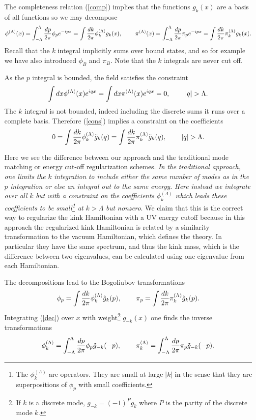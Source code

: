 \def\letter{0}\def\pr{0}\documentclass[a4paper,12pt, epsfig]{article}
\def\hsp{,\hspace{.7cm}}
\renewcommand{\(}{\begin{equation}}
\renewcommand{\)}{end{equation} \vspace{-.05in}\linebreak}
\renewcommand{\=}{\hspace{-.03in}=\hspace{-.02in}}
\renewcommand{\(}{\begin{equation}}
\renewcommand{\)}{\end{equation}}
\renewcommand{\hsp}{,\hspace{.3in}}
\renewcommand{\(}{\begin{equation}}
\renewcommand{\)}{\end{equation}}
\def\lpin#1{\int^\Lambda_{-\Lambda} \frac{d#1}{2\pi}}
\def\pin#1{\int \frac{d#1}{2\pi}}
\renewcommand{\L}{{(\Lambda)}}
\newcommand{\beq}{\begin{equation}}
\newcommand{\eeq}{\end{equation}}
\begin{document}
The completeness relation (\ref{comp}) implies that the functions $g_k(x)$ are a basis of all functions so we may decompose
\beq
\phi^\L(x)=\lpin{p} \phi_p e^{-ipx}=\pin{k}\phi^\L_k g_k(x)
\hsp
\pi^\L(x)=\lpin{p} \pi_p e^{-ipx}=\pin{k}\pi^\L_k g_k(x). \label{dec}
\eeq
Recall that the $k$ integral implicitly sums over bound states, and so for example we have also introduced $\phi_B$ and $\pi_B$.  %
Note that the $k$ integrals are never cut off.

As the $p$ integral is bounded, the field satisfies the constraint
\beq
\int dx \phi^\L(x) e^{iqx}=\int dx \pi^\L(x) e^{iqx}=0\hsp |q|>\Lambda. \label{cons}
\eeq
The $k$ integral is not bounded, indeed including the discrete sums it runs over a complete basis.  Therefore (\ref{cons}) implies a constraint on the coefficients
\beq
0= \pin{k}\phi^\L_k \tilde{g}_k(q)= \pin{k}\pi^\L_k \tilde{g}_k(q)\hsp |q|>\Lambda.  \label{ccons}
\eeq

Here we see the difference between our approach and the traditional mode matching \cite{dhn2} or energy cut-off \cite{rebhan} regularization schemes.  {\it{In the traditional approach, one limits the $k$ integration to include either the same number of modes as in the $p$ integration or else an integral out to the same energy.  Here instead we integrate over all $k$ but with a constraint on the coefficients $\phi^\L_k$ which leads these coefficients to be small\footnote{The $\phi^\L_k$ are operators.  They are small at large $|k|$ in the sense that they are superpositions of $\phi_p$ with small coefficients.} at $k>\Lambda$ but nonzero}}.  We claim that this is the correct way to regularize the kink Hamiltonian with a UV energy cutoff because in this approach the regularized kink Hamiltonian is related by a similarity transformation to the vacuum Hamiltonian, which defines the theory. In particular they have the same spectrum, and thus the kink mass, which is the difference between two eigenvalues, can be calculated using one eigenvalue from each Hamiltonian.

The decompositions lead to the Bogoliubov transformations
\beq
\phi_p= \pin{k}\phi^\L_k \tilde{g}_k(p)\hsp
\pi_p=\pin{k}\pi^\L_k \tilde{g}_k(p).
\eeq
Integrating (\ref{dec}) over $x$ with weight\footnote{If $k$ is a discrete mode, $g_{-k}=(-1)^Pg_k$ where $P$ is the parity of the discrete mode $k$.} $g_{-k}(x)$ one finds the inverse transformations
\beq
\phi^\L_k=\lpin{p}\phi_p\tilde{g}_{-k}(-p)\hsp
\pi^\L_k=\lpin{p}\pi_p\tilde{g}_{-k}(-p). %
\eeq
\end{document}
